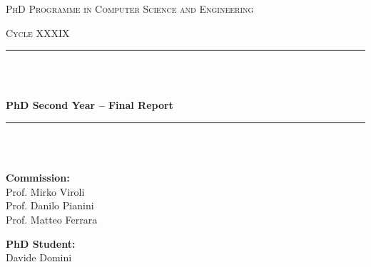 \documentclass[runningheads]{llncs}
\begin{document}
\begin{titlepage}
    \centering
    \vspace*{2cm}
    
    {\scshape\Large PhD Programme in Computer Science and Engineering \par}
    \vspace{0.5cm}
    {\scshape\large Cycle XXXIX \par}
    \vspace{0.5cm}

    \rule{\linewidth}{0.4mm} \\ [0.1mm]
    \raisebox{0.2cm}{\rule{\linewidth}{0.8mm}} \\[0.8cm]
    {\huge\bfseries PhD Second Year -- Final Report \par}
    \vspace{0.8cm}
    \rule{\linewidth}{0.8mm} \\ [0.1pt]
    \raisebox{0.2cm}{\rule{\linewidth}{0.4mm}} \\[1.5cm]
    

    \vspace{1.5cm}
    
    \noindent
    \begin{minipage}[t]{0.45\textwidth}
        \raggedright
        \textbf{Commission:}\\[0.5cm]
        Prof. Mirko Viroli\\
        Prof. Danilo Pianini\\
        Prof. Matteo Ferrara
    \end{minipage}%
    \hfill
    \begin{minipage}[t]{0.45\textwidth}
        \raggedleft
        \textbf{PhD Student:}\\[0.5cm]
        Davide Domini
    \end{minipage}
    
    \vfill
    
\end{titlepage}
\end{document}
